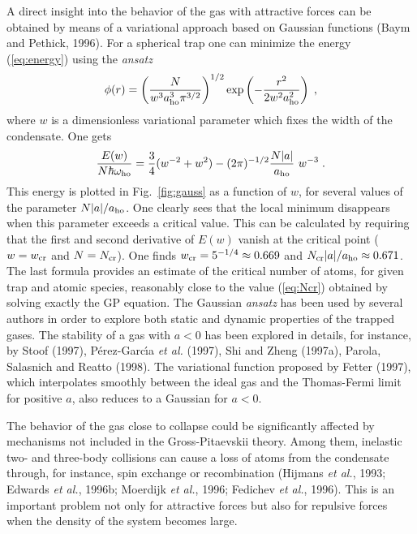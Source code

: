 A direct insight into the behavior of the gas with attractive forces
can be obtained by means of a variational approach based on Gaussian
functions (Baym and Pethick, 1996).  For a spherical trap one can 
minimize the energy (\ref{eq:energy}) using the {\it ansatz}
\begin{equation}
\phi (r) = \left( {N \over w^3 a_{\rm ho}^3  \pi ^{3/2} }
\right)^{1/2} \exp \left( - { r^2 \over 2 w^2 a_{\rm ho}^2 } \right)  \; ,
\label{eq:gaussianapprox}
\end{equation}
where $w$ is a dimensionless variational parameter which fixes the
width of the condensate. One gets
\begin{equation}
{ E (w) \over N \hbar \omega_{\rm ho} }  =
{3 \over 4} ( w^{-2} + w^2 ) - (2\pi)^{-1/2}
{ N |a| \over a_{\rm ho} } \ w^{-3} \; .
\label{eq:eofd}
\end{equation}
This energy is plotted in Fig.~\ref{fig:gauss} as
a function of $w$, for several values of the parameter
$N|a|/a_{\rm ho}$. One clearly sees that the local minimum disappears
when this parameter exceeds a critical value. This can
be calculated by requiring that the first and second derivative
of $E(w)$ vanish at the critical point ($w=w_{\rm cr}$ and $N=N_{\rm cr}$).
One finds
$w_{\rm cr} = 5^{-1/4} \approx 0.669$ and
$N_{\rm cr}|a|/a_{\rm ho}
\approx 0.671$.
The last formula provides an estimate of the critical
number of atoms, for given trap and atomic species, reasonably
close to the  value (\ref{eq:Ncr}) obtained by solving exactly the GP
equation. The Gaussian {\it ansatz} has been used by several authors
in order to explore both static and dynamic properties of the trapped
gases. The stability of a gas with $a<0$ has been explored in details,
for instance, by  Stoof (1997), P\'erez-Garc\'\i a {\it et al.} 
(1997), Shi and Zheng (1997a), Parola, Salasnich and Reatto (1998). 
The variational function proposed by Fetter (1997), which interpolates 
smoothly  between the ideal gas and the Thomas-Fermi limit for 
positive $a$, also reduces to a Gaussian for $a<0$. 

The behavior of the gas close to collapse could be significantly 
affected by mechanisms not included in the Gross-Pitaevskii theory. 
Among them, inelastic two- and three-body collisions can cause a 
loss of atoms from the condensate through, for instance, spin 
exchange or recombination (Hijmans {\it et al.}, 1993; 
Edwards {\it et al.}, 1996b;  Moerdijk {\it et al.}, 1996; 
Fedichev {\it et al.}, 1996).  This is an important problem not 
only for attractive forces but also for repulsive forces when 
the density of the system becomes large. 

